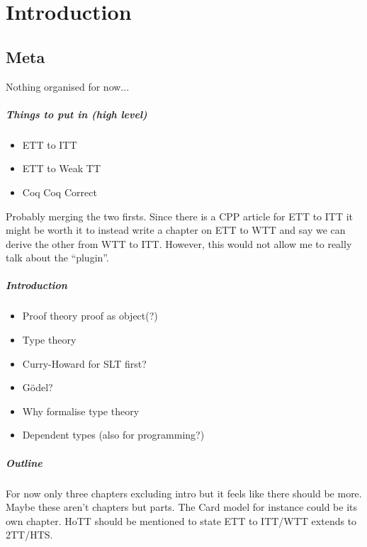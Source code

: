 \setchapterpreamble[u]{\margintoc}
\chapter{Introduction}


\section{Meta}

Nothing organised for now...

\paragraph{Things to put in (high level)}

\begin{itemize}
  \item ETT to ITT
  \item ETT to Weak TT
  \item Coq Coq Correct
\end{itemize}
%
Probably merging the two firsts. Since there is a CPP article for ETT to ITT
it might be worth it to instead write a chapter on ETT to WTT and say we can
derive the other from WTT to ITT.
However, this would not allow me to really talk about the ``plugin''.

\paragraph{Introduction}

\begin{itemize}
  \item Proof theory proof as object(?)
  \item Type theory
  \item Curry-Howard for SLT first?
  \item Gödel?
  \item Why formalise type theory
  \item Dependent types (also for programming?)
\end{itemize}

\paragraph{Outline}

For now only three chapters excluding intro but it feels like there should be
more. Maybe these aren't chapters but parts.
The Card model for instance could be its own chapter.
HoTT should be mentioned to state ETT to ITT/WTT extends to 2TT/HTS.

